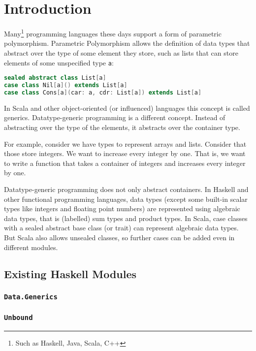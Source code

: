\chapter{Introduction}

Many\footnote{Such as Haskell, Java, Scala, C++} programming languages these days support a form of parametric polymorphism.
Parametric Polymorphism allows the definition of data types that abstract over
the type of some element they store, such as lists that can store elements of
some unspecified type \lstinline{a}:
\begin{lstlisting}[language=scala]
sealed abstract class List[a]
case class Nil[a]() extends List[a]
case class Cons[a](car: a, cdr: List[a]) extends List[a]
\end{lstlisting}
In Scala and other object-oriented (or influenced) languages this concept is
called generics.
Datatype-generic programming is a different concept. Instead of abstracting
over the type of the elements, it abstracts over the container type.

For example, consider we have types to represent arrays and lists. Consider that
those store integers. We want to increase every integer by one. That is, we want
to write a function that takes a container of integers and increases every integer
by one.

Datatype-generic programming does not only abstract containers. In Haskell and
other functional programming languages, data types (except some built-in scalar
types like integers and floating point numbers) are represented using
algebraic data types, that is (labelled) sum types and product types.
In Scala, case classes with a sealed abstract base class (or trait) can
represent algebraic data types.\cite{scalagp}
But Scala also allows unsealed classes, so further cases can be added even in
different modules.


\section{Existing Haskell Modules}
\subsection{\texttt{Data.Generics}}
\subsection{\texttt{Unbound}}

\cite{DBLP:conf/tldi/LammelJ03}
